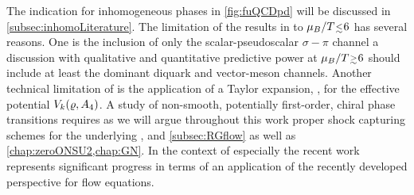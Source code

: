 The indication for inhomogeneous phases in \cref{fig:fuQCDpd} will be discussed in \cref{subsec:inhomoLiterature}.
The limitation of the results in  to $\mu_B/T\smallerlesssim 6$ has several reasons. 
One is the inclusion of only the scalar-pseudoscalar $\sigma-\pi$ channel \dash{} a discussion with qualitative and quantitative predictive power at $\mu_B/T \smallergtrsim 6$ should include at least the dominant diquark and vector-meson channels.
Another technical limitation of  is the application of a \frg{} Taylor expansion, \cf{} \teRef{}, for the effective potential $V_{k}(\varrho,A_4)$. 
A study of non-smooth, potentially first-order, chiral phase transitions requires \dash{} as we will argue throughout this work \dash{} proper shock capturing schemes for the underlying \pdes{}, \cf{}  and \cref{subsec:RGflow} as well as \cref{chap:zeroONSU2,chap:GN}.
In the context of  especially the recent work~\cite{Ihssen:2023xlp} represents significant progress in terms of an application of the recently developed \cfd{} perspective for \frg{} flow equations.

\FloatBarrier
